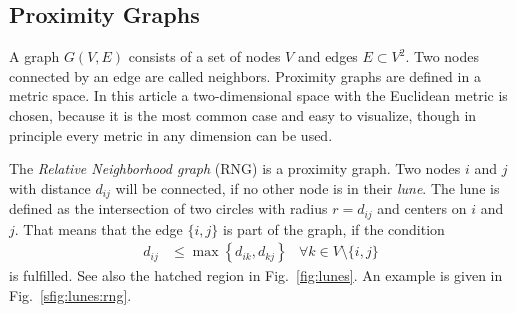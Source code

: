 \label{sec:model}
\subsection{Proximity Graphs}
\label{ssec:graphtypes}
    A graph \(G(V,E)\) consists of a set of nodes \(V\) and edges \(E \subset V^{2}\).
    Two nodes connected by an edge are called neighbors.
    Proximity graphs are defined in a metric space. In this article a
    two-dimensional space with the Euclidean metric is chosen, because
    it is the most common case and easy to visualize, though in principle
    every metric in any dimension can be used.

    The \emph{Relative Neighborhood graph} (RNG) \cite{Toussaint1980} is
    a proximity graph. Two nodes \(i\) and \(j\) with distance $d_{ij}$
    will be connected, if no other node is in their \emph {lune}. The lune
    is defined as the intersection of two circles with radius \(r =
    d_{ij}\) and centers on \(i\) and \(j\). That means that the edge
    $\{i,j\}$ is part of the graph, if the condition
    \begin{align*}
        d_{ij} &\le \max\left\{ d_{ik}, d_{kj} \right\} &\forall k \in V\setminus\{i,j\}
    \end{align*}
    is fulfilled. See also the hatched region
    in Fig.~\ref{fig:lunes}. An example is given in Fig.~\ref{sfig:lunes:rng}.

